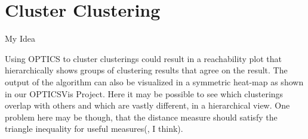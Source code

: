 \documentclass{beamer}
\begin{document}
\section{Cluster Clustering}

\begin{frame}{My Idea}

Using OPTICS to cluster clusterings could result in a reachability plot that hierarchically shows groups of clustering results that agree on the result. The output of the algorithm can also be visualized in a symmetric heat-map as shown in our OPTICSVis Project. Here it may be possible to see which clusterings overlap with others and which are vastly different, in a hierarchical view. One problem here may be though, that the distance measure should satisfy the triangle inequality for useful measures(, I think).

\end{frame}




\end{document}
